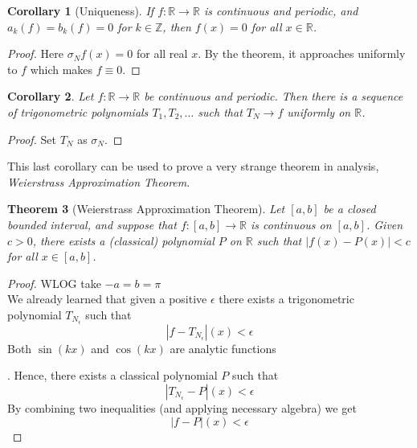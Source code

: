 \documentclass[12pt]{amsart}
\newtheorem{theorem}{Theorem}[section]
\newtheorem{corollary}[theorem]{Corollary}
\theoremstyle{definition}
\begin{document}
\begin{corollary}[Uniqueness] \footnotemark{}




If $f : \mathbb{R} \to \mathbb{R}$ is continuous and periodic, and $a_k(f) = b_k(f) = 0$ for $k \in \mathbb{Z}$, then $f(x) = 0$ for all $x \in \mathbb{R}$.
\end{corollary}


\begin{proof}
    Here $\sigma_Nf(x) = 0$ for all real $x$. By the theorem, it approaches uniformly to \(f\) which makes $f \equiv 0$.
\end{proof}


\begin{corollary}
    Let $f : \mathbb{R} \rightarrow \mathbb{R}$ be continuous and periodic. Then there is a sequence of trigonometric polynomials $T_1, T_2, \ldots$ such that $T_N \rightarrow f$ uniformly on $\mathbb{R}$.
\end{corollary}


\begin{proof}
    Set $T_N$ as $\sigma_N$.
\end{proof}


This last corollary can be used to prove a very strange theorem in analysis, \textit{Weierstrass Approximation Theorem}.


\begin{theorem}[Weierstrass Approximation Theorem] Let $[a, b]$ be a closed bounded interval, and suppose that $f : [a, b] \rightarrow \mathbb{R}$ is continuous on $[a, b]$. Given $c > 0$, there exists a (classical) polynomial $P$ on $\mathbb{R}$ such that $|f(x) - P(x)| < c$ for all $x \in [a, b]$.
\end{theorem}


\begin{proof} WLOG take $-a = b = \pi$\\
    We already learned that given a positive $\epsilon$ there exists a trigonometric polynomial $T_{N_\epsilon}$ such that
    \[
    |f - T_{N_\epsilon}|(x) < \epsilon
    \]
    Both $\sin(kx)$ and $\cos(kx)$ are analytic functions \footnotemark{}



    . Hence, there exists a classical polynomial $P$ such that
    \[
    |T_{N_\epsilon} - P|(x) < \epsilon
    \]
    By combining two inequalities (and applying necessary algebra) we get
    \[
    |f - P|(x) < \epsilon
    \]
\end{proof}
\end{document}
